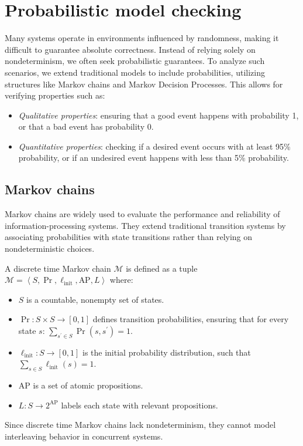 \section{Probabilistic model checking}

Many systems operate in environments influenced by randomness, making it difficult to guarantee absolute correctness.
Instead of relying solely on nondeterminism, we often seek probabilistic guarantees.
To analyze such scenarios, we extend traditional models to include probabilities, utilizing structures like Markov chains and Markov Decision Processes. 
This allows for verifying properties such as:
\begin{itemize}
    \item \textit{Qualitative properties}: ensuring that a good event happens with probability 1, or that a bad event has probability 0.
    \item \textit{Quantitative properties}: checking if a desired event occurs with at least 95\% probability, or if an undesired event happens with less than 5\% probability.
\end{itemize}

\subsection{Markov chains}
Markov chains are widely used to evaluate the performance and reliability of information-processing systems. 
They extend traditional transition systems by associating probabilities with state transitions rather than relying on nondeterministic choices.
\begin{definition}
    A discrete time Markov chain $\mathcal{M}$ is defined as a tuple $\mathcal{M}=\left\langle S,\Pr,\ell_{\text{init}},\text{AP},L\right\rangle$ where: 
    \begin{itemize}
        \item $S$ is a countable, nonempty set of states.
        \item $\Pr : S \times S \rightarrow [0, 1]$ defines transition probabilities, ensuring that for every state $s$: $\sum_{s^\prime\in S}\Pr(s,s^\prime)=1$. 
        \item $\ell_{\text{init}}:S\rightarrow [0,1]$ is the initial probability distribution, such that $\sum_{s\in S}\ell_{\text{init}}(s)=1$.
        \item $\text{AP}$ is a set of atomic propositions.
        \item $L : S \rightarrow 2^{\text{AP}}$ labels each state with relevant propositions.
    \end{itemize}
\end{definition}
\noindent Since discrete time Markov chains lack nondeterminism, they cannot model interleaving behavior in concurrent systems.

